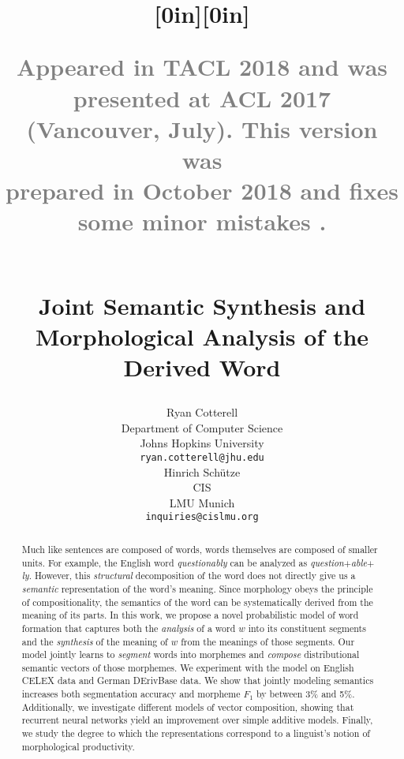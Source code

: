 \documentclass[11pt,letterpaper]{article}
\title{\raisebox{1ex}[0in][0in]{\parbox[b]{\linewidth}{\begin{flushright}\footnotesize
        \textmd{\textsf{\textcolor{gray}{Appeared in TACL 2018 and was presented at ACL 2017 (Vancouver, July).  This
          version was \\ prepared in October 2018 and fixes some minor mistakes .}}}\end{flushright}}}\\ \vspace{-1ex}Joint Semantic Synthesis and Morphological Analysis of the Derived Word}
\author{Ryan Cotterell \\
Department of Computer Science \\
Johns Hopkins University \\
{\tt ryan.cotterell@jhu.edu} \\\And
Hinrich Sch{\"u}tze \\
CIS \\
LMU Munich  \\
{\tt inquiries@cislmu.org}}
\newcommand{\word}[1]{{\em #1}}
\begin{document}
\maketitle

\def\figref#1{Figure~\ref{fig:#1}}
\def\figlabel#1{\label{fig:#1}\label{p:#1}}
\def\Tabref#1{Table~\ref{tab:#1}}
\def\tabref#1{Table~\ref{tab:#1}}
\def\tablabel#1{\label{tab:#1}\label{p:#1}}
\def\Secref#1{\S\ref{sec:#1}}
\def\secref#1{\S\ref{sec:#1}}
\def\seclabel#1{\label{sec:#1}\label{p:#1}}
\def\eqref#1{Equation~\ref{eqn:#1}}
\def\eqrefn#1{\ref{eqn:#1}}
\def\eqsref#1#2{Equations~\ref{eqn:#1}/\ref{eqn:#2}}
\def\eqlabel#1{\label{eqn:#1}}
\def\subsp#1{P_{\mbox{{\scriptsize\rm #1}}}}

\def\spacesavingparagraph#1{\paragraph{#1}}

%
%
%





\begin{abstract}
  Much like sentences are composed of words, words themselves are
  composed of smaller units. For example, the English word
  \word{questionably} can be analyzed as
  \word{question}$+$\word{able}$+$\word{ly}. However, this {\em
    structural} decomposition of the word does not directly give us a
  \emph{semantic} representation of the word's meaning.
  Since  morphology obeys the principle of compositionality, the semantics of the word
  can be systematically derived from the meaning of its parts. In this
  work, we propose a novel probabilistic model of word formation that
  captures both the \emph{analysis} of a word $w$ into its constituent
  segments and the \emph{synthesis} of the meaning of $w$
  from the meanings of those segments. Our model jointly learns
  to \emph{segment} words into morphemes and \emph{compose} distributional
  semantic vectors of those morphemes.
  We experiment with the model on English
CELEX data and German DErivBase \cite{zeller2013derivbase} data. We show that jointly modeling semantics increases
both segmentation accuracy and morpheme $F_1$ by between 3\%
and 5\%. Additionally,
we investigate different models of vector composition, showing
that recurrent neural networks yield an improvement
  over simple additive models. Finally, we study
   the degree to which the representations correspond to
  a linguist's notion of morphological productivity.
\end{abstract}
\end{document}
